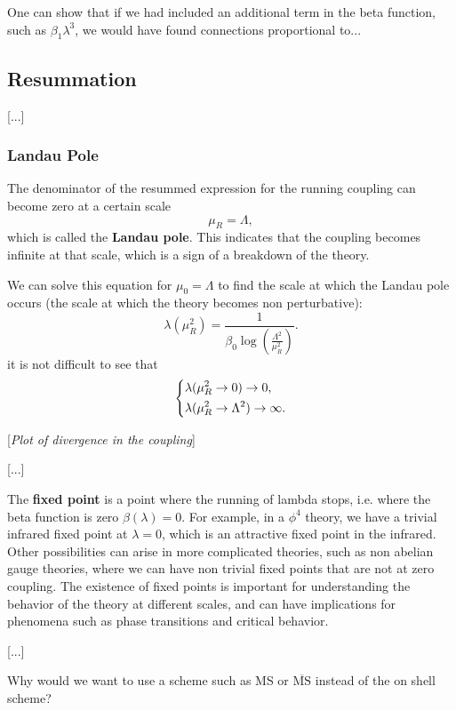 One can show that if we had included an additional term in the beta function, such as \(\beta_1 \lambda^3\), we would have found connections proportional to...

\subsection{Resummation}

[...]

\subsubsection{Landau Pole}

The denominator of the resummed expression for the running coupling can become zero at a certain scale
\[
    \mu_R = \Lambda,
\]
which is called the \textbf{Landau pole}. This indicates that the coupling becomes infinite at that scale, which is a sign of a breakdown of the theory.

We can solve this equation for \(\mu_0 = \Lambda\) to find the scale at which the Landau pole occurs (the scale at which the theory becomes non perturbative):
\[
    \lambda(\mu_R^2) = \frac{1}{\beta_0 \log \left( \frac{\Lambda^2}{\mu_R^2} \right)}.
\]
it is not difficult to see that
\[
    \begin{dcases}
        \lambda(\mu_R^2 \to 0) \to 0, \\
        \lambda(\mu_R^2 \to \Lambda^2) \to \infty.
    \end{dcases}
\]

[\textit{Plot of divergence in the coupling}]

[...]

The \textbf{fixed point} is a point where the running of lambda stops, i.e. where the beta function is zero \(\beta(\lambda) = 0\). For example, in a \(\phi^4\) theory, we have a trivial infrared fixed point at \(\lambda = 0\), which is an attractive fixed point in the infrared. Other possibilities can arise in more complicated theories, such as non abelian gauge theories, where we can have non trivial fixed points that are not at zero coupling. The existence of fixed points is important for understanding the behavior of the theory at different scales, and can have implications for phenomena such as phase transitions and critical behavior.

    [...]

Why would we want to use a scheme such as MS or \(\overline{\text{MS}}\) instead of the on shell scheme?

